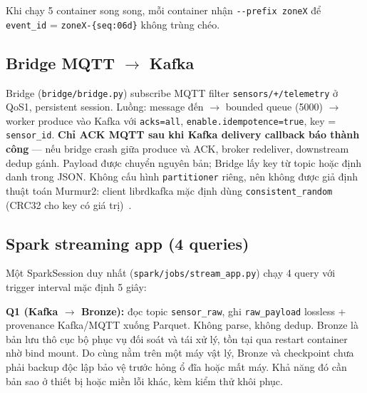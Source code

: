 Khi chạy 5 container song song, mỗi container nhận \texttt{-{}-prefix zoneX}
để \texttt{event\_id} = \texttt{zoneX-\{seq:06d\}} không trùng chéo.

\subsection{Bridge MQTT \texorpdfstring{$\rightarrow$}{sang} Kafka}

Bridge (\texttt{bridge/bridge.py}) subscribe MQTT filter
\texttt{sensors/+/telemetry} ở QoS1, persistent session. Luồng: message đến
$\rightarrow$ bounded queue (5000) $\rightarrow$ worker produce vào Kafka với
\texttt{acks=all}, \texttt{enable.idempotence=true}, key = \texttt{sensor\_id}.
\textbf{Chỉ ACK MQTT sau khi Kafka delivery callback báo thành công} --- nếu
bridge crash giữa produce và ACK, broker redeliver, downstream dedup gánh.
Payload được chuyển nguyên bản; Bridge lấy key từ topic hoặc định danh
trong JSON. Không cấu hình \texttt{partitioner} riêng, nên không được giả
định thuật toán Murmur2: client librdkafka mặc định dùng
\texttt{consistent\_random} (CRC32 cho key có giá trị)~\cite{librdkafka_config}.

\subsection{Spark streaming app (4 queries)}
\label{subsec:spark-stream}

Một SparkSession duy nhất (\texttt{spark/jobs/stream\_app.py}) chạy 4 query
với trigger interval mặc định 5 giây:

\textbf{Q1 (Kafka $\rightarrow$ Bronze):} đọc topic \texttt{sensor\_raw}, ghi
\texttt{raw\_payload} lossless + provenance Kafka/MQTT xuống Parquet. Không
parse, không dedup. Bronze là bản lưu thô cục bộ phục vụ đối soát và tái
xử lý, tồn tại qua restart container nhờ bind mount. Do cùng nằm trên một
máy vật lý, Bronze và checkpoint chưa phải backup độc lập bảo vệ trước
hỏng ổ đĩa hoặc mất máy. Khả năng đó cần bản sao ở thiết bị hoặc miền lỗi
khác, kèm kiểm thử khôi phục.

